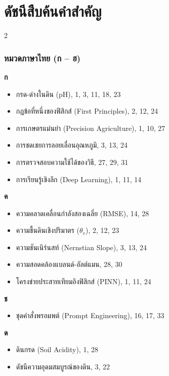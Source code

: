 \chapter*{ดัชนีสืบค้นคำสำคัญ}

\begin{multicols}{2}
\raggedright
\small

\subsection*{หมวดภาษาไทย (ก -- ฮ)}

\textbf{ก}
\begin{itemize}[leftmargin=1.5em, itemsep=1pt]
    \item กรด-ด่างในดิน (pH), 1, 3, 11, 18, 23
    \item กฎข้อที่หนึ่งของฟิสิกส์ (First Principles), 2, 12, 24
    \item การเกษตรแม่นยำ (Precision Agriculture), 1, 10, 27
    \item การชดเชยการลอยเลื่อนอุณหภูมิ, 3, 13, 24
    \item การตรวจสอบความใช้ได้ของวิธี, 27, 29, 31
    \item การเรียนรู้เชิงลึก (Deep Learning), 1, 11, 14
\end{itemize}

\textbf{ค}
\begin{itemize}[leftmargin=1.5em, itemsep=1pt]
    \item ความคลาดเคลื่อนกำลังสองเฉลี่ย (RMSE), 14, 28
    \item ความชื้นดินเชิงปริมาตร ($\theta_v$), 2, 12, 23
    \item ความชันเนิร์นสท์ (Nernstian Slope), 3, 13, 24
    \item ความสอดคล้องแบลนด์-อัลต์แมน, 28, 30
    \item โครงข่ายประสาทเทียมอิงฟิสิกส์ (PINN), 1, 11, 24
\end{itemize}

\textbf{ช}
\begin{itemize}[leftmargin=1.5em, itemsep=1pt]
    \item ชุดคำสั่งพรอมพต์ (Prompt Engineering), 16, 17, 33
\end{itemize}

\textbf{ด}
\begin{itemize}[leftmargin=1.5em, itemsep=1pt]
    \item ดินกรด (Soil Acidity), 1, 28
    \item ดัชนีความอุดมสมบูรณ์ของดิน, 3, 22
\end{itemize}


\end{multicols}

